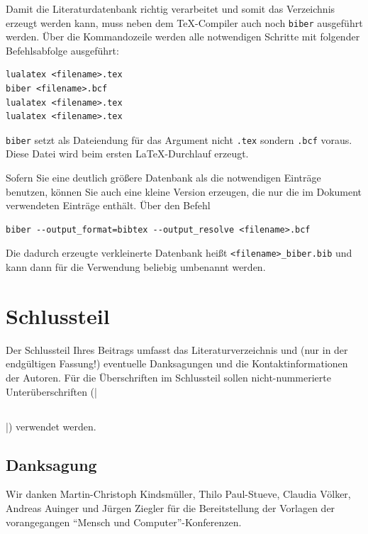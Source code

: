 \documentclass[ngerman]{mucproc}
\newenvironment{minted}[2][]{\endgraf\verbatim}{\endverbatim}
\begin{document}
Damit die Literaturdatenbank richtig verarbeitet und somit das Verzeichnis erzeugt werden kann, muss neben dem \TeX-Compiler auch noch \texttt{biber} ausgeführt werden. Über die Kommandozeile werden alle notwendigen Schritte mit folgender Befehlsabfolge ausgeführt:

\begin{verbatim}
lualatex <filename>.tex
biber <filename>.bcf
lualatex <filename>.tex
lualatex <filename>.tex
\end{verbatim}

\texttt{biber} setzt als Dateiendung für das Argument nicht \texttt{.tex} sondern \texttt{.bcf} voraus. Diese Datei wird beim ersten \LaTeX-Durchlauf erzeugt.

Sofern Sie eine deutlich größere Datenbank als die notwendigen Einträge benutzen, können Sie auch eine kleine Version erzeugen, die nur die im Dokument verwendeten Einträge enthält. Über den Befehl
\begin{verbatim}
biber --output_format=bibtex --output_resolve <filename>.bcf
\end{verbatim}
Die dadurch erzeugte verkleinerte Datenbank heißt \texttt{<filename>\_biber.bib} und kann dann für die Verwendung beliebig umbenannt werden.

\section{Schlussteil}
Der Schlussteil Ihres Beitrags umfasst das Literaturverzeichnis und (nur in der endgültigen Fassung!) eventuelle Danksagungen und die Kontaktinformationen der Autoren. Für die Überschriften im Schlussteil sollen nicht-nummerierte Unterüberschriften (|\subsection*{}|) verwendet werden.


\subsection*{Danksagung}
Wir danken Martin-Christoph Kindsmüller, Thilo Paul-Stueve, Claudia Völker, Andreas Auinger und Jürgen Ziegler für die Bereitstellung der Vorlagen der vorangegangen \enquote{Mensch und Computer}-Konferenzen.


\end{document}
